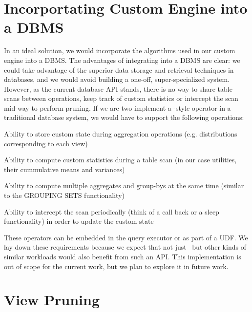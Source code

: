 \section{Incorportating Custom Engine into a DBMS}
\label{sec:incorporating}

In an ideal solution, we would incorporate the algorithms used in our custom
engine into a DBMS. 
The advantages of integrating into a DBMS are clear: we could take advantage of
the superior data storage and retrieval techniques in databases, and we would
avoid building a one-off, super-specialized system.
However, as the current database API stands, there is no way to share table
scans between operations, keep track of custom statistics or intercept the scan
mid-way to perform pruning.
If we are two implement a \VizRecDB-style operator in a traditional database
system, we would have to support the following operations:
\squishlist
\item Ability to store custom state during aggregation operations (e.g.
distributions corresponding to each view)
\item Ability to compute custom statistics during a table scan (in our case
utilities, their cummulative means and variances)
\item Ability to compute multiple aggregates and group-bys at the same time
(similar to the GROUPING SETS functionality)
\item Ability to intercept the scan periodically (think of a call back or a
sleep functionality) in order to update the custom state
\squishend

These operators can be embedded in the query executor or as part of a UDF.
We lay down these requirements because we expect that not just \VizRecDB\ but
other kinds of similar workloads would also benefit from such an API.
This implementation is out of scope for the current work, but we plan to explore
it in future work.

\section{View Pruning}

